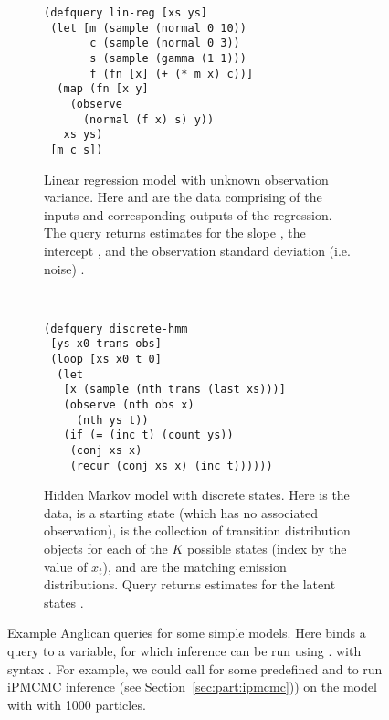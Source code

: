 \begin{figure}[t]
	\centering
	\begin{subfigure}[t]{0.45\textwidth}
			\centering	
\begin{lstlisting}[basicstyle=\ttfamily\footnotesize]
(defquery lin-reg [xs ys]
 (let [m (sample (normal 0 10))  
       c (sample (normal 0 3))
       s (sample (gamma (1 1)))
       f (fn [x] (+ (* m x) c))]
  (map (fn [x y]
    (observe 
      (normal (f x) s) y))
   xs ys)
 [m c s])
\end{lstlisting}				
			\caption{Linear regression model with unknown
				observation variance.  Here  and
	  are the data comprising of the inputs and corresponding
	 outputs of the regression.  The query returns estimates
	 for the slope , the intercept , and the observation
	 standard deviation (i.e. noise) . \label{fig:probprog:lregang}
		}
	\end{subfigure}
~~
	\begin{subfigure}[t]{0.52\textwidth}
		\centering	
\begin{lstlisting}[basicstyle=\ttfamily\footnotesize]
(defquery discrete-hmm
 [ys x0 trans obs]
 (loop [xs x0 t 0]
  (let 
   [x (sample (nth trans (last xs)))]
   (observe (nth obs x) 
     (nth ys t))
   (if (= (inc t) (count ys))
    (conj xs x)
    (recur (conj xs x) (inc t))))))
\end{lstlisting}	
		\caption{Hidden Markov model with discrete states.
	Here  is the data,  is a starting state (which
	has no associated observation),  is the collection of 
	transition distribution objects for each of the $K$ possible states
	(index by the value of $x_t$), and  are the matching
	emission distributions.	Query returns
	estimates for the latent states .\label{fig:probprog:hmm}
		 }
	\end{subfigure}
		\caption{Example Anglican queries for some simple models. Here 
			binds a query to a variable, for which inference can be run using \doquery. 
			with syntax
			{\footnotesize {}}. 
			For example, we could call {\footnotesize {}}  for some
			predefined  and  to run iPMCMC inference (see Section~\ref{sec:part:ipmcmc}))
			on the  model with with 1000 particles.
			\label{fig:probprog:example-ang}}
\end{figure}

